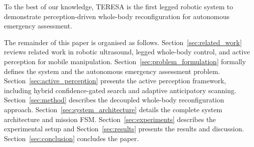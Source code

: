 To the best of our knowledge, \ac{TERESA} is the first legged robotic system to
demonstrate perception-driven whole-body reconfiguration for autonomous
emergency assessment.

The remainder of this paper is organised as follows.
Section~\ref{sec:related_work} reviews related work in robotic ultrasound,
legged whole-body control, and active perception for mobile manipulation.
Section~\ref{sec:problem_formulation} formally defines the system and the
autonomous emergency assessment problem.
Section~\ref{sec:active_perception} presents the active perception framework,
including hybrid confidence-gated search and adaptive anticipatory scanning.
Section~\ref{sec:method} describes the decoupled whole-body reconfiguration
approach. Section~\ref{sec:system_architecture} details the complete system
architecture and mission \ac{FSM}. Section~\ref{sec:experiments} describes the
experimental setup and Section~\ref{sec:results} presents the results and
discussion. Section~\ref{sec:conclusion} concludes the paper.
